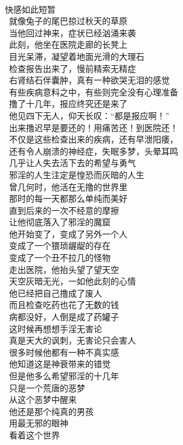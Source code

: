 \begin{poem}[撸没一生]
    \begin{multicols}{2}
        \begin{center}~\\
            快感如此短暂 \\\ 就像兔子的尾巴掠过秋天的草原 \\\ 当他回过神来，症状已经汹涌来袭 \\\ 此刻，他坐在医院走廊的长凳上 \\\ 目光呆滞，凝望着地面光滑的大理石 \\\ 检查报告出来了，慢前精索无精症 \\\ 右肾结石伴囊肿，真有一种欲哭无泪的感觉 \\\ 有些疾病意料之中，有些则完全没有心理准备 \\\ 撸了十几年，报应终究还是来了 \\\ 他见四下无人，仰天长叹：“都是报应啊！” \\\ 出来撸迟早是要还的！用痛苦还！到医院还！ \\\ 不仅是这些检查出来的疾病，还有早泄阳痿， \\\ 还有令人崩溃的神经症，失眠多梦，头晕耳鸣 \\\ 几乎让人失去活下去的希望与勇气 \\\ 邪淫的人生注定是惶恐而灰暗的人生 \\\ 曾几何时，他活在无撸的世界里 \\\ 那时的每一天都那么单纯而美好 \\\ 直到后来的一次不经意的摩擦 \\\ 让他彻底落入了邪淫的魔窟 \\\ 他开始变了，变成了另外一个人 \\\ 变成了一个猥琐龌龊的存在 \\\ 变成了一个丑不拉几的怪物 \\\ 走出医院，他抬头望了望天空 \\\ 天空灰暗无光，一如他此刻的心情 \\\ 他已经把自己撸成了废人 \\\ 而且检查吃药也花了无数的钱 \\\ 病都没好，人倒是成了药罐子 \\\ 这时候再想想手淫无害论 \\\ 真是天大的讽刺，无害论只会害人 \\\ 很多时候他都有一种不真实感 \\\ 他知道这是神衰带来的错觉 \\\ 但是他多么希望邪淫的十几年 \\\ 只是一个荒唐的恶梦 \\\ 从这个恶梦中醒来 \\\ 他还是那个纯真的男孩 \\\ 用最无邪的眼神 \\\ 看着这个世界
        \end{center}
    \end{multicols}
\end{poem}

